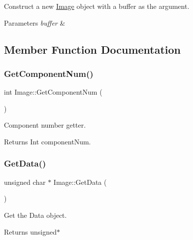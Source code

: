 Construct a new \hyperlink{classImage}{Image} object with a buffer as the argument. 


\begin{DoxyParams}{Parameters}
{\em buffer} & \\
\hline
\end{DoxyParams}


\subsection{Member Function Documentation}
\mbox{\label{classImage_a04e02c5aa54d26422bbaa777b08de4c9}} 
\subsubsection{\texorpdfstring{Get\+Component\+Num()}{GetComponentNum()}}
{\footnotesize\ttfamily int Image\+::\+Get\+Component\+Num (\begin{DoxyParamCaption}{ }\end{DoxyParamCaption})}



Component number getter. 

\begin{DoxyReturn}{Returns}
Int component\+Num. 
\end{DoxyReturn}
\mbox{\label{classImage_a6337e9b91fb0aeb0b482d7e933543608}} 
\subsubsection{\texorpdfstring{Get\+Data()}{GetData()}}
{\footnotesize\ttfamily unsigned char $\ast$ Image\+::\+Get\+Data (\begin{DoxyParamCaption}{ }\end{DoxyParamCaption})}



Get the Data object. 

\begin{DoxyReturn}{Returns}
unsigned$\ast$ 
\end{DoxyReturn}
\mbox{\label{classImage_a4d6de643ee334ff52c85da9a62d9297d}} 
